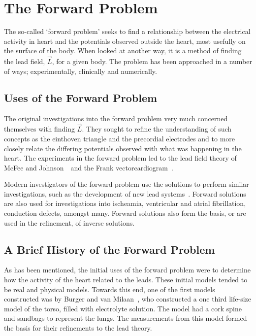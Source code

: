 \section{The Forward Problem}

The so-called `forward problem' seeks to find a relationship between the
electrical activity in heart and the potentials observed outside the heart,
most usefully on the surface of the body.
When looked at another way, it is a method of finding the lead field, $\vec{L}$,
for a given body.
The problem has been approached in a number of ways; experimentally, clinically
and numerically.

\subsection{Uses of the Forward Problem}

The original investigations into the forward problem very much concerned
themselves with finding $\vec{L}$.
They sought to refine the understanding of such concepts as the einthoven
triangle and the precordial electrodes and to more closely relate the differing
potentials observed with what was happening in the heart.
The experiments in the forward problem led to the lead field theory of McFee and
Johnson~\cite{McFee1953}\ and the Frank vectorcardiogram~\cite{Frank1956}.

Modern investigators of the forward problem use the solutions to perform similar
investigations, such as the development of new lead systems~\cite{Ihara2007}.
Forward solutions are also used for investigations into ischeamia, ventricular
and atrial fibrillation, conduction defects, amongst many.
Forward solutions also form the basis, or are used in the refinement, of inverse
solutions.

\subsection{A Brief History of the Forward Problem}

As has been mentioned, the initial uses of the forward problem were to determine
how the activity of the heart related to the leads.
These initial models tended to be real and physical models.
Towards this end, one of the first models constructed was by Burger and van
Milaan~\cite{Burger1946}, who constructed a one third life-size model of the
torso, filled with electrolyte solution.
The model had a cork spine and sandbags to represent the lungs.
The measurements from this model formed the basis for their refinements to the
lead theory.


